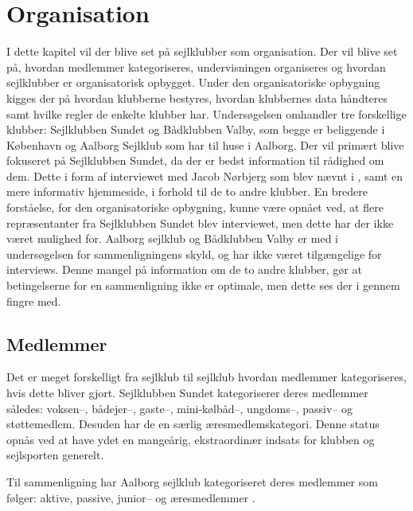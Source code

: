 \chapter{Organisation}\label{chap:organisation}

I dette kapitel vil der blive set på sejlklubber som organisation. Der vil blive set på, hvordan medlemmer
kategoriseres, undervisningen organiseres og hvordan sejlklubber er organisatorisk opbygget. Under den
organisatoriske opbygning kigges der på hvordan klubberne bestyres, hvordan klubbernes data håndteres samt
hvilke regler de enkelte klubber har. 
Undersøgelsen omhandler tre forskellige klubber: Sejlklubben Sundet og Bådklubben Valby, som begge er beliggende i København og Aalborg Sejlklub som har til huse i Aalborg. 
Der vil primært blive fokuseret på Sejlklubben Sundet,
da der er bedst information til rådighed om dem. 
Dette i form af interviewet med Jacob Nørbjerg som blev nævnt i , samt en mere informativ hjemmeside, i forhold til de to
andre klubber. 
En bredere forståelse, for den organisatoriske opbygning, kunne være opnået ved, at flere repræsentanter fra Sejlklubben Sundet blev interviewet, men dette har der ikke været mulighed for.
Aalborg sejlklub og Bådklubben Valby er med i undersøgelsen for sammenligningens skyld, og har
ikke været tilgængelige for interviews. 
Denne mangel på information om de to andre klubber, gør at betingelserne for en sammenligning ikke er optimale, men dette ses der i gennem fingre med. 


\section{Medlemmer}\label{sec:organisation-medlemmer}

Det er meget forskelligt fra sejlklub til sejlklub hvordan medlemmer kategoriseres, hvis dette bliver gjort.
Sejlklubben Sundet kategoriserer deres medlemmer således: voksen--, bådejer--, gaste--, mini-kølbåd--,
ungdoms--, passiv-- og støttemedlem. 
Desuden har de en særlig æresmedlemskategori. Denne status opnås ved at have ydet en mangeårig, ekstraordinær indsats for klubben og sejlsporten generelt.\citep{sundet_vedtaegter}

Til sammenligning har Aalborg sejlklub kategoriseret deres medlemmer som følger: aktive, passive, junior-- og
æresmedlemmer \citep{aalborg_sejlklub_vedtaegter}.

